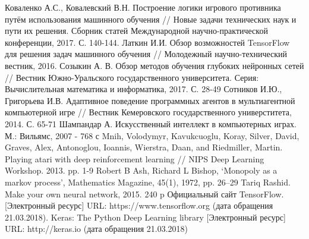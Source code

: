 \newpage
\setlength{\parskip}{0cm}
\begin{Large}
\begin{thebibliography}{99}
 Коваленко А.С., Ковалевский В.Н. Построение логики игрового противника путём использования машинного обучения // Новые задачи технических наук и пути их решения. Сборник статей Международной научно-практической конференции, 2017.  С. 140-144.
 Латкин И.И. Обзор возможностей TensorFlow для решения задач машинного обучения // Молодежный научно-технический вестник, 2016. 
 Созыкин А. В. Обзор методов обучения глубоких нейронных сетей // Вестник Южно-Уральского государственного университета. Серия: Вычислительная математика и информатика, 2017. С. 28-49
 Сотников И.Ю., Григорьева И.В. Адаптивное поведение программных агентов в мультиагентной компьютерной игре // Вестник Кемеровского государственного универститета, 2014. С. 65-71
 Шампандар А. Искусственный интеллект в компьютерных играх. М.: Вильямс, 2007 - 768 с
 Mnih, Volodymyr, Kavukcuoglu, Koray, Silver, David, Graves, Alex, Antonoglou, Ioannis, Wierstra, Daan, and Riedmiller, Martin. Playing atari with deep reinforcement learning // NIPS Deep Learning Workshop. 2013. pp. 1-9
 Robert B Ash, Richard L Bishop, ‘Monopoly as a markov process’, Mathematics Magazine, 45(1), 1972, pp. 26–29
 Tariq Rashid. Make your own neural network, 2015. 240 p
 Официальный сайт TensorFlow. [Электронный ресурс] URL: https://www.tensorflow.org (дата обращения 21.03.2018).
 Keras: The Python Deep Learning library [Электронный ресурс] URL: http://keras.io (дата обращения 21.03.2018)
\end{thebibliography}
\end{Large}